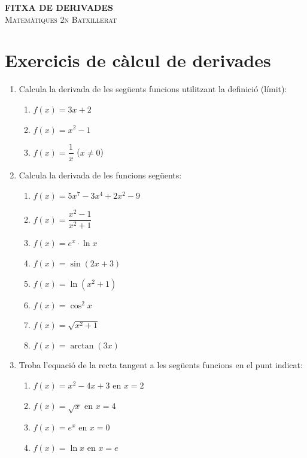 \documentclass[12pt]{article}
\begin{document}
\begin{center}
    {\Large \textbf{FITXA DE DERIVADES}} \\
    \vspace{0.2cm}
    \textsc{Matemàtiques 2n Batxillerat}
\end{center}

\vspace{0.5cm}

\section*{Exercicis de càlcul de derivades}

\begin{enumerate}[label=\arabic*.]
    \item Calcula la derivada de les següents funcions utilitzant la definició (límit):
    \begin{enumerate}[label=\alph*)]
        \item $f(x)=3x+2$
        \item $f(x)=x^2-1$
        \item $f(x)=\dfrac{1}{x}$ \quad ($x\neq 0$)
    \end{enumerate}

    \item Calcula la derivada de les funcions següents:
    \begin{enumerate}[label=\alph*)]
        \item $f(x)=5x^7-3x^4+2x^2-9$
        \item $f(x)=\dfrac{x^2-1}{x^2+1}$
        \item $f(x)=e^x\cdot \ln x$
        \item $f(x)=\sin(2x+3)$
        \item $f(x)=\ln(x^2+1)$
        \item $f(x)=\cos^2 x$
        \item $f(x)=\sqrt{x^2+1}$
        \item $f(x)=\arctan(3x)$
    \end{enumerate}

    \item Troba l'equació de la recta tangent a les següents funcions en el punt indicat:
    \begin{enumerate}[label=\alph*)]
        \item $f(x)=x^2-4x+3$ en $x=2$
        \item $f(x)=\sqrt{x}$ en $x=4$
        \item $f(x)=e^x$ en $x=0$
        \item $f(x)=\ln x$ en $x=e$
    \end{enumerate}


\end{enumerate}
\end{document}
